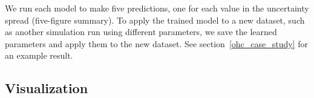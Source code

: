 



We run each model to make five predictions, one for each value in the uncertainty spread (five-figure summary). %
To apply the trained model to a new dataset, such as another simulation run using different parameters, we save the learned parameters and apply them to the new dataset. See section~\ref{ohc_case_study} for an example result.

\subsection{Visualization}
\label{vis}



